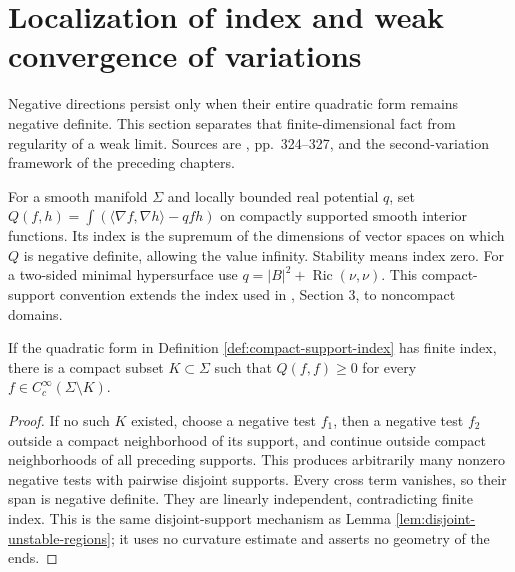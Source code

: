 \chapter{Localization of index and weak convergence of variations}\label{sec:index-convergence}
Negative directions persist only when their entire quadratic form remains negative definite. This section separates that finite-dimensional fact from regularity of a weak limit. Sources are \cite{Sharp17}, pp.~324--327, and the second-variation framework of the preceding chapters.

\begin{definition}\label{def:compact-support-index}
For a smooth manifold $\Sigma$ and locally bounded real potential $q$, set $Q(f,h)=\int(\langle\nabla f,\nabla h\rangle-qfh)$ on compactly supported smooth interior functions. Its index is the supremum of the dimensions of vector spaces on which $Q$ is negative definite, allowing the value infinity. Stability means index zero. For a two-sided minimal hypersurface use $q=|B|^2+\operatorname{Ric}(\nu,\nu)$. This compact-support convention extends the index used in \cite{Sharp17}, Section 3, to noncompact domains.
\end{definition}

\begin{proposition}\label{prop:finite-index-stable-outside}
If the quadratic form in Definition \ref{def:compact-support-index} has finite index, there is a compact subset $K\subset\Sigma$ such that $Q(f,f)\geq0$ for every $f\in C_c^\infty(\Sigma\setminus K)$.
\end{proposition}
\begin{proof}
If no such $K$ existed, choose a negative test $f_1$, then a negative test $f_2$ outside a compact neighborhood of its support, and continue outside compact neighborhoods of all preceding supports. This produces arbitrarily many nonzero negative tests with pairwise disjoint supports. Every cross term vanishes, so their span is negative definite. They are linearly independent, contradicting finite index. This is the same disjoint-support mechanism as Lemma \ref{lem:disjoint-unstable-regions}; it uses no curvature estimate and asserts no geometry of the ends.
\end{proof}

